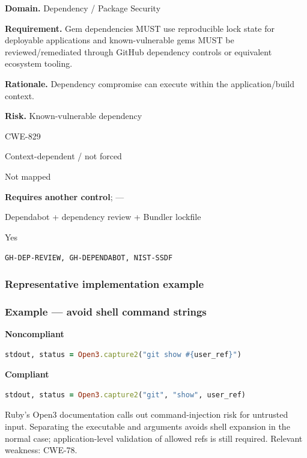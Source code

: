 \documentclass[10pt,letterpaper]{article}
\newcommand{\prioritybadge}[2]{\tcbox[on line,boxrule=0pt,arc=1.2mm,boxsep=0.7mm,left=1mm,right=1mm,top=0.4mm,bottom=0.4mm,colback=#2!12,coltext=#2]{\scriptsize\bfseries #1}}
\begin{document}
\begin{rulebox}[title={\texttt{SCS-RUBY-DEP-001} \hfill \prioritybadge{High Priority}{High}}]
\textbf{Domain.} Dependency / Package Security

\textbf{Requirement.} Gem dependencies MUST use reproducible lock state for deployable applications and known-vulnerable gems MUST be reviewed/remediated through GitHub dependency controls or equivalent ecosystem tooling.

\textbf{Rationale.} Dependency compromise can execute within the application/build context.

\textbf{Risk.} Known-vulnerable dependency

\begin{description}[leftmargin=2.65cm,labelwidth=2.3cm,style=nextline,itemsep=1pt,topsep=3pt]
  \item[CWE] CWE-829
  \item[OWASP] Context-dependent / not forced
  \item[CERT] Not mapped
  \item[CodeQL] \textbf{Requires another control}; ---
  \item[Enforcement] Dependabot + dependency review + Bundler lockfile
  \item[Automation] Yes
  \item[Sources] \texttt{GH-DEP-REVIEW, GH-DEPENDABOT, NIST-SSDF}
\end{description}
\end{rulebox}
\subsubsection*{Representative implementation example}
\subsubsection*{Example --- avoid shell command strings}

\textbf{Noncompliant}\par
\begin{lstlisting}[language={Ruby}]
stdout, status = Open3.capture2("git show #{user_ref}")
\end{lstlisting}

\textbf{Compliant}\par
\begin{lstlisting}[language={Ruby}]
stdout, status = Open3.capture2("git", "show", user_ref)
\end{lstlisting}

Ruby's Open3 documentation calls out command-injection risk for untrusted input. Separating the executable and arguments avoids shell expansion in the normal case; application-level validation of allowed refs is still required. Relevant weakness: CWE-78.\par
\end{document}
